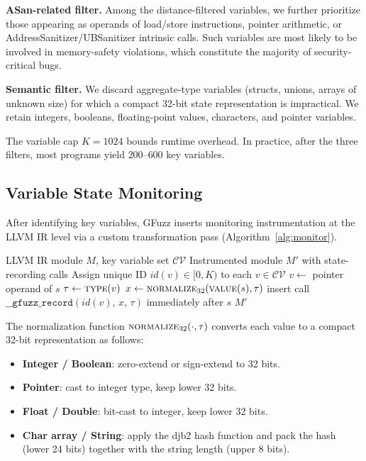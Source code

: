 \documentclass[preprint,12pt,3p]{elsarticle}
\begin{document}
\textbf{ASan-related filter.}  Among the distance-filtered variables, we
further prioritize those appearing as operands of load/store instructions,
pointer arithmetic, or AddressSanitizer/UBSanitizer intrinsic calls.  Such
variables are most likely to be involved in memory-safety violations, which
constitute the majority of security-critical bugs.

\textbf{Semantic filter.}  We discard aggregate-type variables (structs,
unions, arrays of unknown size) for which a compact 32-bit state
representation is impractical.  We retain integers, booleans, floating-point
values, characters, and pointer variables.

The variable cap $K = 1024$ bounds runtime overhead.  In practice, after the
three filters, most programs yield $200$--$600$ key variables.

\subsection{Variable State Monitoring}
\label{sec:monitor}

After identifying key variables, GFuzz inserts monitoring instrumentation at
the LLVM IR level via a custom transformation pass
(Algorithm~\ref{alg:monitor}).

\begin{algorithm}[t]
\caption{Variable State Monitoring (LLVM Instrumentation Pass)}
\label{alg:monitor}
\begin{algorithmic}[1]
\Require LLVM IR module $M$, key variable set $\mathcal{CV}$
\Ensure Instrumented module $M'$ with state-recording calls
\State Assign unique ID $\mathit{id}(v) \in [0,K)$ to each $v \in \mathcal{CV}$
    \State $v \leftarrow$ pointer operand of $s$
      \State $\tau \leftarrow \textsc{type}(v)$
      \State $x \leftarrow \textsc{normalize}_{32}(\textsc{value}(s), \tau)$
      \State insert call
        $\texttt{\_\_gfuzz\_record}(\mathit{id}(v),\, x,\, \tau)$
        immediately after $s$
    \EndIf
  \EndFor
\EndFor
\State \Return $M'$
\end{algorithmic}
\end{algorithm}

The normalization function $\textsc{normalize}_{32}(\cdot,\tau)$ converts
each value to a compact 32-bit representation as follows:
\begin{itemize}
  \item \textbf{Integer / Boolean}: zero-extend or sign-extend to 32 bits.
  \item \textbf{Pointer}: cast to integer type, keep lower 32 bits.
  \item \textbf{Float / Double}: bit-cast to integer, keep lower 32 bits.
  \item \textbf{Char array / String}: apply the djb2 hash function and pack
    the hash (lower 24 bits) together with the string length (upper 8 bits).
\end{itemize}
\end{document}
